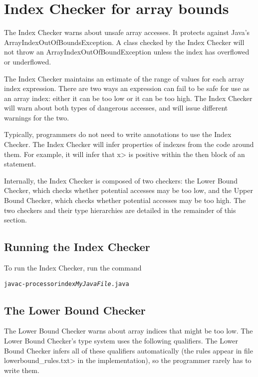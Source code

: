 \chapter{Index Checker for array bounds\label{index-checker}}

The Index Checker warns about unsafe array accesses.  It protects
against Java's ArrayIndexOutOfBoundsException. A class checked by the
Index Checker  will not throw an ArrayIndexOutOfBoundException unless the
index has overflowed or underflowed.

The Index Checker maintains an estimate of the range of values for each array
index expression.  There are two ways an expression can fail to be safe for use as an
array index: either it can be too low or it can be too high. The Index
Checker will warn about both types of dangerous accesses, and will
issue different warnings for the two.

Typically, programmers do not need to write annotations to use the
Index Checker. The Index Checker will infer properties of indexes from
the code around them.  For example, it will infer that \<x> is positive
within the then block of an  statement.

Internally, the Index Checker is composed of two checkers: the Lower
Bound Checker, which checks whether potential accesses may be too low,
and the Upper Bound Checker, which checks whether potential accesses
may be too high. The two checkers and their type hierarchies are
detailed in the remainder of this section.

\section{Running the Index Checker\label{index-running}}

To run the Index Checker, run the command

\begin{alltt}
javac -processor index \emph{MyJavaFile}.java
\end{alltt}


\section{The Lower Bound Checker\label{index-lowerbound}}

The Lower Bound Checker warns about array indices that might be
too low.  The
Lower Bound Checker's type system uses the following qualifiers.
The Lower Bound Checker infers all of these qualifiers automatically (the
rules appear in file \<lowerbound\_rules.txt> in the implementation),
so the programmer rarely has to write them.

